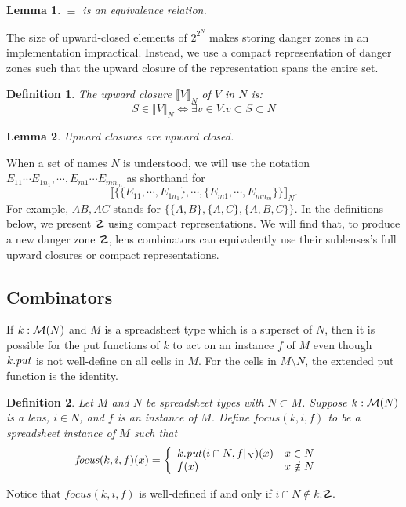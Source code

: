 \documentclass{article}
\newtheorem{lemma}{Lemma}
\newtheorem{definition}{Definition}
\begin{document}
\begin{lemma}
    $\equiv$ is an equivalence relation.
\end{lemma}

The size of upward-closed elements of $2^{2^N}$ makes storing danger zones
in an implementation impractical. Instead, we use a compact representation
of danger zones such that the upward closure of the representation
spans the entire set.

\newcommand{\upclose}[2]{\llbracket #1 \rrbracket_{#2}}
\begin{definition}
    The \emph{upward closure} $\upclose VN$ of $V$ in $N$ is:
    \[S \in \upclose VN \iff \exists v \in V. v \subset S \subset N\]
\end{definition}

\begin{lemma}
    Upward closures are upward closed.
\end{lemma}

When a set of names $N$ is understood, we will use the notation
$E_{11}\cdots E_{1n_1},\cdots,E_{m1}\cdots E_{mn_m}$ as shorthand for
\[\upclose{\{\{E_{11},\cdots,E_{1n_1}\},\cdots,\{E_{m1},\cdots,E_{mn_m}\}\}}N.\]
For example, $AB,AC$ stands for $\{\{A,B\},\{A,C\},\{A,B,C\}\}$. In the definitions
below, we present $\danger$ using compact representations. We will find
that, to produce a new danger zone $\danger$, lens combinators can
equivalently use their sublenses's full upward closures or
compact representations.

\subsection{Combinators}

\newcommand{\cond}[1]{\left\{\begin{array}{ll}#1\end{array}\right.}

\newcommand{\focus}{\mathit{focus}}
If $k : \mathcal M(N)$ and $M$ is a spreadsheet type which is a superset of $N$,
then it is possible for the put functions of $k$ to act on an instance $f$
of $M$ even though $k.\mathit{put}$ is not well-define on all cells in $M$. 
For the cells in $M \setminus N$, the extended put function is the identity.
\begin{definition} Let $M$ and $N$ be spreadsheet types with $N \subset M$. 
    Suppose $k : \mathcal M(N)$ is a lens, $i \in N$,
    and $f$ is an instance of $M$. Define $\focus(k,i,f)$ to be a spreadsheet
    instance of $M$ such that
    \begin{align*}
        \focus(k,i,f)(x) &= \cond{
            k.\mput(i \cap N,f|_N)(x) & x \in N \\
            f(x) & x \notin N
        }
    \end{align*}
\end{definition}
Notice that $\focus(k,i,f)$ is well-defined if and only if $i \cap N \not\in k.\danger$.
\end{document}
